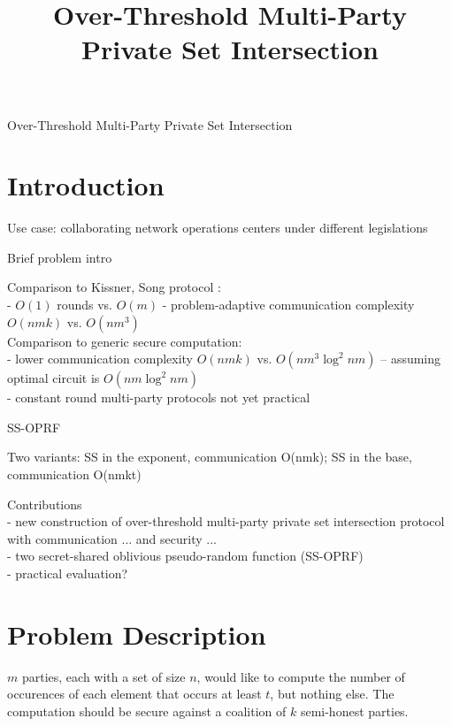 \documentclass[10pt, sigconf]{acmart}
\title{Over-Threshold Multi-Party Private Set Intersection}
\date{}
\begin{document}
\pagestyle{plain} %
\onecolumn
\begingroup
\centering
{\Huge Over-Threshold Multi-Party Private Set Intersection}\\[3em]
\endgroup

\section{Introduction}

Use case: collaborating network operations centers under different legislations

Brief problem intro

Comparison to Kissner, Song protocol \cite{Kissner}: \\
- $O(1)$ rounds vs. $O(m)$
- problem-adaptive communication complexity $O(nmk)$ vs. $O(nm^3)$ \\

Comparison to generic secure computation: \\
- lower communication complexity $O(nmk)$ vs. $O(nm^3 \log^2 nm)$ -- assuming optimal circuit is $O(nm \log^2 nm)$ \\
- constant round multi-party protocols not yet practical

SS-OPRF

Two variants: SS in the exponent, communication O(nmk); SS in the base, communication O(nmkt)

Contributions \\
- new construction of over-threshold multi-party private set intersection protocol with communication ... and security ... \\
- two secret-shared oblivious pseudo-random function (SS-OPRF) \\
- practical evaluation?

\section{Problem Description}

$m$ parties, each with a set of size $n$, would like to compute the number of occurences of each element that occurs at least $t$, but nothing else.
The computation should be secure against a coalition of $k$ semi-honest parties.
\end{document}
